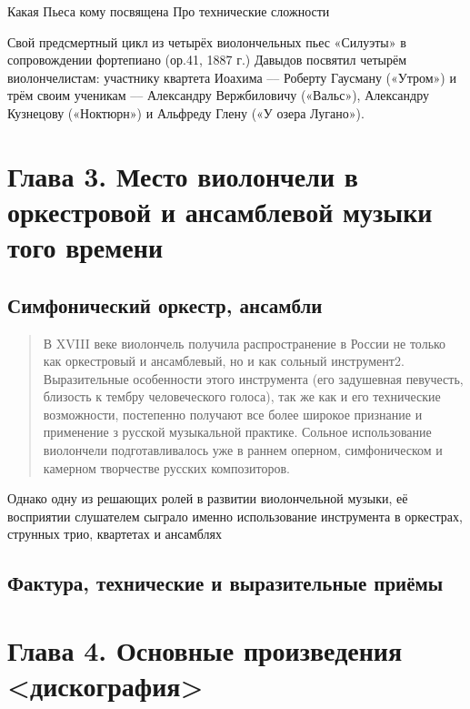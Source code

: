\documentclass[12pt,a4paper,oneside,titlepage,draft]{extreport}
\begin{document}
		Какая
Пьеса кому посвящена
Про технические сложности
		
		Свой предсмертный цикл из четырёх виолончельных пьес «Силуэты» в сопровождении фортепиано (ор.41, 1887 г.) Давыдов посвятил четырём виолончелистам: участнику квартета Иоахима --– Роберту Гаусману («Утром») и трём своим ученикам --– Александру Вержбиловичу  («Вальс»), Александру Кузнецову  («Ноктюрн»)  и Альфреду Глену  («У озера Лугано»).
		
	
	\section*{Глава 3. Место виолончели в оркестровой и ансамблевой музыки того времени}
		
		\subsection*{Симфонический оркестр, ансамбли}
		
		\begin{quotation}
		В XVIII веке виолончель получила распространение в 
России не только как оркестровый и ансамблевый, но и как 
сольный инструмент2. Выразительные особенности этого 
инструмента (его задушевная певучесть, близость к тембру 
человеческого голоса), так же как и его технические возможности,
постепенно получают все более широкое признание и 
применение з русской музыкальной практике. Сольное использование
виолончели подготавливалось уже в раннем оперном, 
симфоническом и камерном творчестве русских композиторов.
		\end{quotation}

		Однако одну из решающих ролей в развитии виолончельной музыки, её восприятии слушателем сыграло именно использование инструмента в оркестрах, струнных трио, квартетах и ансамблях
		
		\subsection*{Фактура, технические и выразительные приёмы}
		

	\section*{Глава 4. Основные произведения <дискография>}
		
\end{document}
